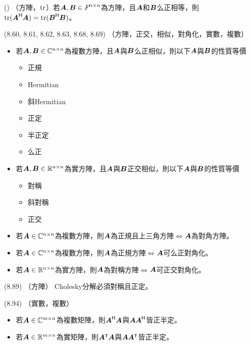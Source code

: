 \item \begin{theorem}{()} （方陣，$\operatorname{tr}$）若$\boldsymbol{A}, \boldsymbol{B} \in \textit{F}^{n \times n}$為方陣，且$\boldsymbol{A}$和$\boldsymbol{B}$么正相等，則$\operatorname{tr}(\boldsymbol{A}^{\mathsf{H}}\boldsymbol{A}) = \operatorname{tr}(\boldsymbol{B}^{\mathsf{H}}\boldsymbol{B})$。
\end{theorem}

\item \begin{theorem}{(8.60, 8.61, 8.62, 8.63, 8.68, 8.69)} （方陣，正交，相似，對角化，實數，複數）
	\begin{itemize}
		\item 若$\boldsymbol{A}, \boldsymbol{B} \in \mathbb{C}^{n \times n}$為複數方陣，且$\boldsymbol{A}$與$\boldsymbol{B}$么正相似，則以下$\boldsymbol{A}$與$\boldsymbol{B}$的性質等價
			\begin{itemize}
				\item 正規
				\item Hermitian
				\item 斜Hermitian
				\item 正定
				\item 半正定
				\item 么正
			\end{itemize}
		\item 若$\boldsymbol{A}, \boldsymbol{B} \in \mathbb{R}^{n \times n}$為實方陣，且$\boldsymbol{A}$與$\boldsymbol{B}$正交相似，則以下$\boldsymbol{A}$與$\boldsymbol{B}$的性質等價
		\begin{itemize}
			\item 對稱
			\item 斜對稱
			\item 正交
		\end{itemize}
		\item 若$\boldsymbol{A} \in \mathbb{C}^{n \times n}$為複數方陣，則$\boldsymbol{A}$為正規且上三角方陣$\iff$$\boldsymbol{A}$為對角方陣。
		\item 若$\boldsymbol{A} \in \mathbb{C}^{n \times n}$為複數方陣，則$\boldsymbol{A}$為正規方陣$\iff$$\boldsymbol{A}$可么正對角化。
		\item 若$\boldsymbol{A} \in \mathbb{R}^{n \times n}$為實方陣，則$\boldsymbol{A}$為對稱方陣$\iff$$\boldsymbol{A}$可正交對角化。
	\end{itemize}
\end{theorem}

\item \begin{theorem}{(8.89)} （方陣） Cholesky分解必須對稱且正定。
\end{theorem}

\item \begin{theorem}{(8.94)} （實數，複數）
	\begin{itemize}
		\item 若$\boldsymbol{A} \in \mathbb{C}^{m \times n}$為複數矩陣，則$\boldsymbol{A}^{\mathsf{H}}\boldsymbol{A}$與$\boldsymbol{A}\boldsymbol{A}^{\mathsf{H}}$皆正半定。
		\item 若$\boldsymbol{A} \in \mathbb{R}^{m \times n}$為實矩陣，則$\boldsymbol{A}^\intercal\boldsymbol{A}$與$\boldsymbol{A}\boldsymbol{A}^\intercal$皆正半定。
	\end{itemize}
\end{theorem}

